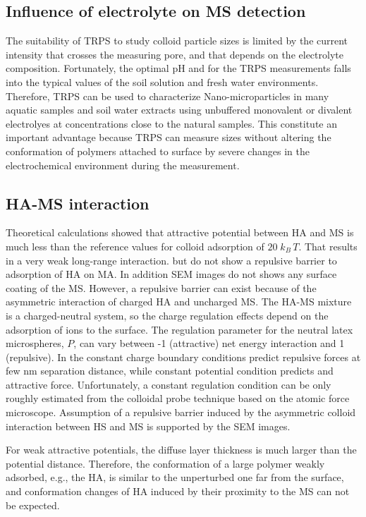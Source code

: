 \documentclass[journal=langd5,manuscript=article]{achemso}
\begin{document}
\subsection{Influence of electrolyte on MS detection}
%
The suitability of TRPS to study colloid particle sizes is limited by the current intensity that crosses the measuring pore, and  that depends on the electrolyte composition. Fortunately, the optimal pH and \ce{[Ca^{2+}]} for the TRPS measurements falls into the typical values of the soil solution\cite{wolt1994soil} and  fresh water environments\cite{Stumm1993}. Therefore, TRPS can be used to characterize Nano-microparticles in many  aquatic samples and soil water extracts using unbuffered monovalent or divalent electrolyes at concentrations close to the natural samples. This constitute an important advantage because TRPS can measure sizes without altering the conformation of polymers attached to surface by severe changes in the electrochemical environment during the measurement.

\subsection{HA-MS interaction}
Theoretical calculations showed that attractive potential between HA and MS 
is much less than the reference values for colloid adsorption  of $20\;k_B\,T$\cite{Adamczyk1999}. That results in a very weak long-range interaction.
but do not show a repulsive barrier to adsorption of HA on MA. In addition 
 SEM images do not shows any surface coating of the MS. 
However, a repulsive barrier can exist because of the asymmetric interaction of charged HA and uncharged MS. 
The HA-MS mixture is a charged-neutral system, so the charge regulation effects depend on the adsorption of ions to the surface.
The regulation parameter for the neutral latex microspheres, $P$, can vary between -1 (attractive) net energy interaction and 1  (repulsive). In the constant charge boundary conditions predict  repulsive forces at few nm separation distance, while constant potential condition predicts and attractive force\cite{Trefalt2014}.
Unfortunately, a constant regulation condition can be only roughly estimated from the  colloidal probe technique based on the atomic force microscope\cite{Ruiz-Cabello2013}.
Assumption of a repulsive barrier induced by the asymmetric colloid interaction between HS and MS is supported by the SEM images.

For weak attractive potentials, the diffuse layer thickness is much larger than the potential distance. Therefore, the conformation of a large  polymer weakly adsorbed, e.g., the HA, is similar to the unperturbed one far from the surface\cite{Netz2003}, and conformation changes of HA induced by their proximity to the MS can not be expected.
\end{document}
